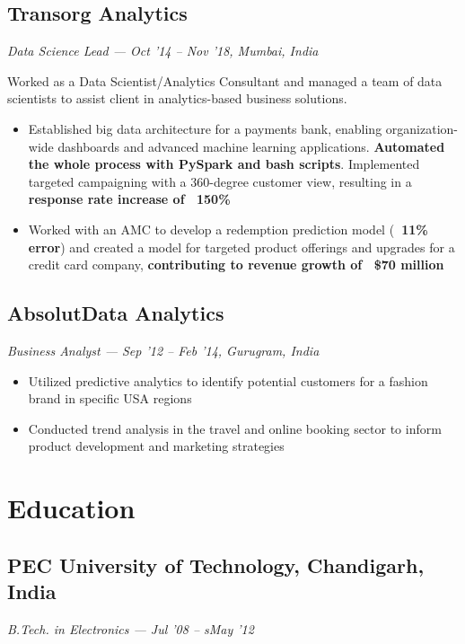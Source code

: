 \documentclass[letterpaper,10pt]{article}
\begin{document}
  \subsection*{Transorg Analytics}
  \textit{Data Science Lead — Oct '14 -- Nov '18, Mumbai, India}
  \textit{\newline}

  Worked as a Data Scientist/Analytics Consultant and managed a team of data scientists to assist client in analytics-based business solutions.
  \begin{itemize}[leftmargin=1em]
    \item Established big data architecture for a payments bank, enabling organization-wide dashboards and advanced machine learning applications. \textbf{Automated the whole process with PySpark and bash scripts}. Implemented targeted campaigning with a 360-degree customer view, resulting in a \textbf{response rate increase of ~150\%}
    \item Worked with an AMC to develop a redemption prediction model (\textbf{~11\% error}) and created a model for targeted product offerings and upgrades for a credit card company, \textbf{contributing to revenue growth of ~\$70 million}
  \end{itemize}

  \subsection*{AbsolutData Analytics}
  \textit{Business Analyst — Sep '12 -- Feb '14, Gurugram, India}
  \textit{\newline}
  \begin{itemize}[leftmargin=1em]
    \item Utilized predictive analytics to identify potential customers for a fashion brand in specific USA regions
    \item Conducted trend analysis in the travel and online booking sector to inform product development and marketing strategies
  \end{itemize}


  \section{Education}
  \subsection*{PEC University of Technology, Chandigarh, India}
  \textit{B.Tech. in Electronics — Jul '08 -- sMay '12}
\end{document}

